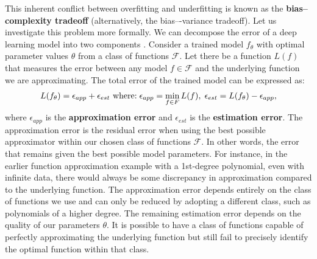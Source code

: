 This inherent conflict between overfitting and underfitting is known as the \textbf{bias--complexity tradeoff} (alternatively, the bias–-variance tradeoff). Let us investigate this problem more formally. We can decompose the error of a deep learning model into two components \cite{shalev-shwartzUnderstandingMachineLearning2014}. Consider a trained model $f_\theta$ with optimal parameter values $\theta$ from a class of functions $\mathcal{F}$. Let there be a function $L(f)$ that measures the error between any model $f \in \mathcal{F}$ and the underlying function we are approximating. The total error of the trained model can be expressed as:
\begin{equation}
	L(f_\theta) = \epsilon_{app} + \epsilon_{est}
	\text{ where:\;}  \epsilon_{app} = \min_{f \in F}L(f),\;
	\epsilon_{est} = L(f_\theta) - \epsilon_{app},
\end{equation}
where $\epsilon_{app}$ is the \textbf{approximation error} and $\epsilon_{est}$ is the \textbf{estimation error}. The approximation error is the residual error when using the best possible approximator within our chosen class of functions $\mathcal{F}$. In other words, the error that remains given the best possible model parameters. For instance, in the earlier function approximation example with a 1st-degree polynomial, even with infinite data, there would always be some discrepancy in approximation compared to the underlying function. The approximation error depends entirely on the class of functions we use and can only be reduced by adopting a different class, such as polynomials of a higher degree. The remaining estimation error depends on the quality of our parameters $\theta$. It is possible to have a class of functions capable of perfectly approximating the underlying function but still fail to precisely identify the optimal function within that class.

